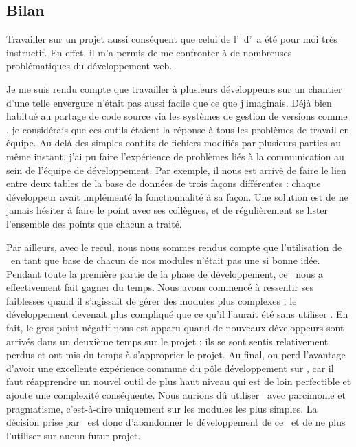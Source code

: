 \subsection{Bilan}
\label{section:eyrolles_bilan}

Travailler sur un projet aussi conséquent que celui de l'\aintranet\ d'\aey\ a été pour moi très instructif. En effet, il m'a permis de me confronter à de nombreuses problématiques du développement web.

Je me suis rendu compte que travailler à plusieurs développeurs sur un chantier d'une telle envergure n'était pas aussi facile que ce que j'imaginais. Déjà bien habitué au partage de code source via les systèmes de gestion de versions comme \asvn, je considérais que ces outils étaient la réponse à tous les problèmes de travail en équipe. Au-delà des simples conflits de fichiers modifiés par plusieurs parties au même instant, j'ai pu faire l'expérience de problèmes liés à la communication au sein de l'équipe de développement. Par exemple, il nous est arrivé de faire le lien entre deux tables de la base de données de trois façons différentes : chaque développeur avait implémenté la fonctionnalité à sa façon. Une solution est de ne jamais hésiter à faire le point avec ses collègues, et de régulièrement se lister l'ensemble des points que chacun a traité.

Par ailleurs, avec le recul, nous nous sommes rendus compte que l'utilisation de \asladmin\ en tant que base de chacun de nos modules n'était pas une si bonne idée. Pendant toute la première partie de la phase de développement, ce \aplugin\ nous a effectivement fait gagner du temps. Nous avons commencé à ressentir ses faiblesses quand il s'agissait de gérer des modules plus complexes : le développement devenait plus compliqué que ce qu'il l'aurait été sans utiliser \asladmin. En fait, le gros point négatif nous est apparu quand de nouveaux développeurs sont arrivés dans un deuxième temps sur le projet : ils se sont sentis relativement perdus et ont mis du temps à s'approprier le projet. Au final, on perd l'avantage d'avoir une excellente expérience commune du pôle développement sur \asf, car il faut réapprendre un nouvel outil de plus haut niveau qui est de loin perfectible et ajoute une complexité conséquente. Nous aurions dû utiliser \asladmin\ avec parcimonie et pragmatisme, c'est-à-dire uniquement sur les modules les plus simples. La décision prise par \asl\ est donc d'abandonner le développement de ce \aplugin\ et de ne plus l'utiliser sur aucun futur projet.

